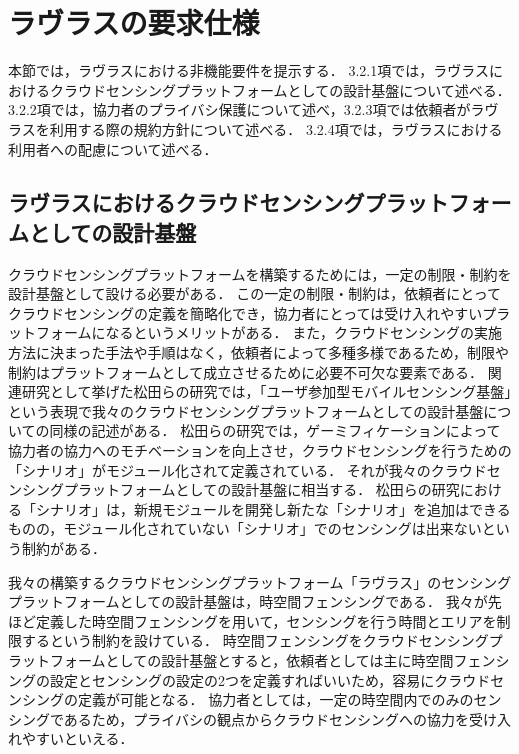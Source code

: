 \section{ラヴラスの要求仕様}

本節では，ラヴラスにおける非機能要件を提示する．
3.2.1項では，ラヴラスにおけるクラウドセンシングプラットフォームとしての設計基盤について述べる．
3.2.2項では，協力者のプライバシ保護について述べ，3.2.3項では依頼者がラヴラスを利用する際の規約方針について述べる．
3.2.4項では，ラヴラスにおける利用者への配慮について述べる．

\subsection{ラヴラスにおけるクラウドセンシングプラットフォームとしての設計基盤}
クラウドセンシングプラットフォームを構築するためには，一定の制限・制約を設計基盤として設ける必要がある．
この一定の制限・制約は，依頼者にとってクラウドセンシングの定義を簡略化でき，協力者にとっては受け入れやすいプラットフォームになるというメリットがある．
また，クラウドセンシングの実施方法に決まった手法や手順はなく，依頼者によって多種多様であるため，制限や制約はプラットフォームとして成立させるために必要不可欠な要素である．
関連研究として挙げた松田らの研究\cite{matsu}では，「ユーザ参加型モバイルセンシング基盤」という表現で我々のクラウドセンシングプラットフォームとしての設計基盤についての同様の記述がある．
松田らの研究では，ゲーミフィケーションによって協力者の協力へのモチベーションを向上させ，クラウドセンシングを行うための「シナリオ」がモジュール化されて定義されている．
それが我々のクラウドセンシングプラットフォームとしての設計基盤に相当する．
松田らの研究における「シナリオ」は，新規モジュールを開発し新たな「シナリオ」を追加はできるものの，モジュール化されていない「シナリオ」でのセンシングは出来ないという制約がある．

我々の構築するクラウドセンシングプラットフォーム「ラヴラス」のセンシングプラットフォームとしての設計基盤は，時空間フェンシングである．
我々が先ほど定義した時空間フェンシングを用いて，センシングを行う時間とエリアを制限するという制約を設けている．
時空間フェンシングをクラウドセンシングプラットフォームとしての設計基盤とすると，依頼者としては主に時空間フェンシングの設定とセンシングの設定の2つを定義すればいいため，容易にクラウドセンシングの定義が可能となる．
協力者としては，一定の時空間内でのみのセンシングであるため，プライバシの観点からクラウドセンシングへの協力を受け入れやすいといえる．

